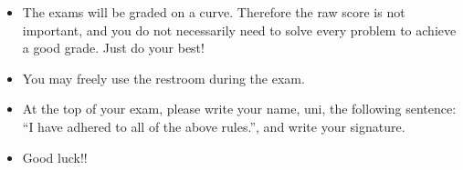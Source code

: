 \documentclass[addpoints]{exam}
\begin{document}
\begin{center}
{{{\begin{itemize}
\item The exams will be graded on a curve. Therefore the raw score is not important, and you do not necessarily need to solve every problem to achieve a good grade. Just do your best!



\item You may freely use the restroom during the exam.

\item At the top of your exam, please write your name, uni, the following sentence: ``I have adhered to all of the above rules.'', and write your signature.


\item Good luck!!
\end{itemize}
}}}
\end{center}
 
  \begin{center}
\gradetable[h][questions]
\end{center}
 
 
% 
% 
% 
 

% 
 
 
% 
% 
% 


\break

\printanswers
\end{document}
